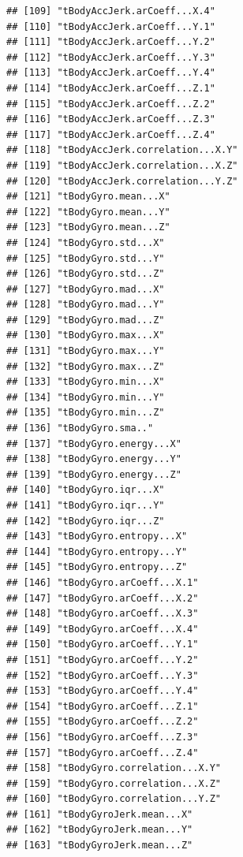 \documentclass[
]{article}
\begin{document}
\begin{verbatim}
## [109] "tBodyAccJerk.arCoeff...X.4"          
## [110] "tBodyAccJerk.arCoeff...Y.1"          
## [111] "tBodyAccJerk.arCoeff...Y.2"          
## [112] "tBodyAccJerk.arCoeff...Y.3"          
## [113] "tBodyAccJerk.arCoeff...Y.4"          
## [114] "tBodyAccJerk.arCoeff...Z.1"          
## [115] "tBodyAccJerk.arCoeff...Z.2"          
## [116] "tBodyAccJerk.arCoeff...Z.3"          
## [117] "tBodyAccJerk.arCoeff...Z.4"          
## [118] "tBodyAccJerk.correlation...X.Y"      
## [119] "tBodyAccJerk.correlation...X.Z"      
## [120] "tBodyAccJerk.correlation...Y.Z"      
## [121] "tBodyGyro.mean...X"                  
## [122] "tBodyGyro.mean...Y"                  
## [123] "tBodyGyro.mean...Z"                  
## [124] "tBodyGyro.std...X"                   
## [125] "tBodyGyro.std...Y"                   
## [126] "tBodyGyro.std...Z"                   
## [127] "tBodyGyro.mad...X"                   
## [128] "tBodyGyro.mad...Y"                   
## [129] "tBodyGyro.mad...Z"                   
## [130] "tBodyGyro.max...X"                   
## [131] "tBodyGyro.max...Y"                   
## [132] "tBodyGyro.max...Z"                   
## [133] "tBodyGyro.min...X"                   
## [134] "tBodyGyro.min...Y"                   
## [135] "tBodyGyro.min...Z"                   
## [136] "tBodyGyro.sma.."                     
## [137] "tBodyGyro.energy...X"                
## [138] "tBodyGyro.energy...Y"                
## [139] "tBodyGyro.energy...Z"                
## [140] "tBodyGyro.iqr...X"                   
## [141] "tBodyGyro.iqr...Y"                   
## [142] "tBodyGyro.iqr...Z"                   
## [143] "tBodyGyro.entropy...X"               
## [144] "tBodyGyro.entropy...Y"               
## [145] "tBodyGyro.entropy...Z"               
## [146] "tBodyGyro.arCoeff...X.1"             
## [147] "tBodyGyro.arCoeff...X.2"             
## [148] "tBodyGyro.arCoeff...X.3"             
## [149] "tBodyGyro.arCoeff...X.4"             
## [150] "tBodyGyro.arCoeff...Y.1"             
## [151] "tBodyGyro.arCoeff...Y.2"             
## [152] "tBodyGyro.arCoeff...Y.3"             
## [153] "tBodyGyro.arCoeff...Y.4"             
## [154] "tBodyGyro.arCoeff...Z.1"             
## [155] "tBodyGyro.arCoeff...Z.2"             
## [156] "tBodyGyro.arCoeff...Z.3"             
## [157] "tBodyGyro.arCoeff...Z.4"             
## [158] "tBodyGyro.correlation...X.Y"         
## [159] "tBodyGyro.correlation...X.Z"         
## [160] "tBodyGyro.correlation...Y.Z"         
## [161] "tBodyGyroJerk.mean...X"              
## [162] "tBodyGyroJerk.mean...Y"              
## [163] "tBodyGyroJerk.mean...Z"              

\end{verbatim}
\end{document}
